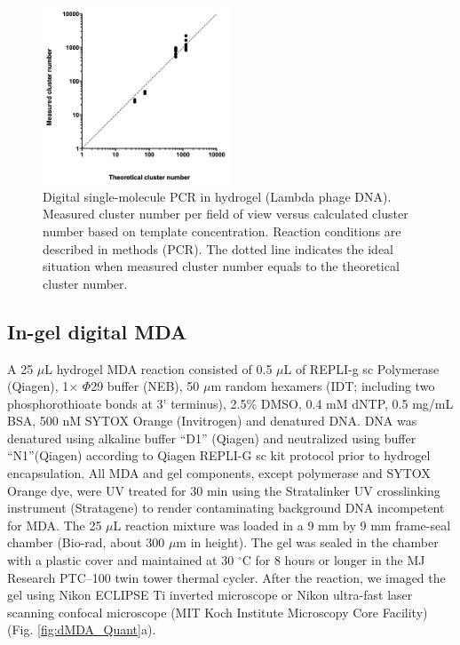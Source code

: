 \begin{figure}
\centering
\includegraphics[keepaspectratio,width=0.5\textwidth]{./figures/SuppFig3.jpg}
\caption[Digital single-molecule PCR in hydrogel (Lambda phage DNA).]{Digital single-molecule PCR in hydrogel (Lambda phage DNA). Measured cluster number per field of view versus calculated cluster number based on template concentration. Reaction conditions are described in methods (PCR). The dotted line indicates the ideal situation when measured cluster number equals to the theoretical cluster number.}
\label{fig:dPCR_Calibration}
\end{figure}

\subsection{In-gel digital MDA}
A 25 $\mu$L hydrogel MDA reaction consisted of 0.5 $\mu$L of REPLI-g sc Polymerase (Qiagen), 1$\times$ $\Phi$29 buffer (NEB), 50 $\mu$m random hexamers (IDT; including two phosphorothioate bonds at 3' terminus), 2.5\% DMSO, 0.4 mM dNTP, 0.5 mg\slash mL BSA, 500 nM SYTOX Orange (Invitrogen) and denatured \textlambda DNA. \textlambda DNA was denatured using alkaline buffer ``D1'' (Qiagen) and neutralized using buffer ``N1''(Qiagen) according to Qiagen REPLI-G sc kit protocol prior to hydrogel encapsulation. All MDA and gel components, except polymerase and SYTOX Orange dye, were UV treated for 30 min using the Stratalinker UV crosslinking instrument (Stratagene) to render contaminating background DNA incompetent for MDA. The 25 $\mu$L reaction mixture was loaded in a 9 mm by 9 mm frame-seal chamber (Bio-rad, about 300 $\mu$m in height). The gel was sealed in the chamber with a plastic cover and maintained at 30 $^{\circ}$C for 8 hours or longer in the MJ Research PTC--100 twin tower thermal cycler. After the reaction, we imaged the gel using Nikon ECLIPSE Ti inverted microscope or Nikon ultra-fast laser scanning confocal microscope (MIT Koch Institute Microscopy Core Facility) (Fig. \ref{fig:dMDA_Quant}a).
